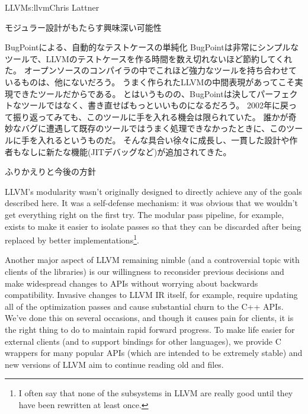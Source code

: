 \begin{aosachapter}{LLVM}{s:llvm}{Chris Lattner}
\begin{aosasect1}{モジュラー設計がもたらす興味深い可能性}
\begin{aosasect2}{BugPointによる、自動的なテストケースの単純化}
BugPointは非常にシンプルなツールで、LLVMのテストケースを作る時間を数え切れないほど節約してくれた。
オープンソースのコンパイラの中でこれほど強力なツールを持ち合わせているものは、他にないだろう。
うまく作られたLLVMの中間表現があってこそ実現できたツールだからである。
とはいうものの、BugPointは決してパーフェクトなツールではなく、書き直せばもっといいものになるだろう。
2002年に戻って振り返ってみても、このツールに手を入れる機会は限られていた。
誰かが奇妙なバグに遭遇して既存のツールではうまく処理できなかったときに、このツールに手を入れるというものだ。
そんな具合い徐々に成長し、一貫した設計や作者もなしに新たな機能(JITデバッグなど)が追加されてきた。

\end{aosasect2}

\end{aosasect1}

\begin{aosasect1}{ふりかえりと今後の方針}

LLVM's modularity wasn't originally designed to directly achieve any
of the goals described here. It was a self-defense mechanism: it was
obvious that we wouldn't get everything right on the first try.  The
modular pass pipeline, for example, exists to make it easier to
isolate passes so that they can be discarded after being replaced by
better implementations\footnote{I often say that none of the
subsystems in LLVM are really good until they have been rewritten at
least once.}.

Another major aspect of LLVM remaining nimble (and a controversial
topic with clients of the libraries) is our willingness to reconsider
previous decisions and make widespread changes to APIs without
worrying about backwards compatibility.  Invasive changes to LLVM IR
itself, for example, require updating all of the optimization passes
and cause substantial churn to the C++ APIs.  We've done this on
several occasions, and though it causes pain for clients, it is the
right thing to do to maintain rapid forward progress.  To make life
easier for external clients (and to support bindings for other
languages), we provide C wrappers for many popular APIs (which are
intended to be extremely stable) and new versions of LLVM aim to
continue reading old  and  files.


\end{aosasect1}
\end{aosachapter}
